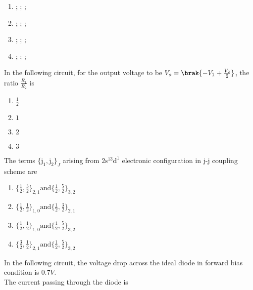 \begin{enumerate}
    \item {}; ; ; 
    \item {}; ; ; 
    \item {}; ; ; 
    \item {}; ; ; 
\end{enumerate}
\item In the following circuit, for the output voltage to be $V_o=\brak{-V_1+\frac{V_2}{2}}$, the ratio $\frac{R_1}{R_2}$ is
	
\begin{enumerate}
    \item $\frac{1}{2}$
    \item $1$
    \item $2$
    \item $3$
\end{enumerate}
\item The terms $\{\text{j}_1, \text{j}_2\}_J$ arising from $2\text{s}^13\text{d}^1$ electronic configuration in j-j coupling scheme are 
\begin{enumerate}
    \item $\{\frac{1}{2}, \frac{3}{2}\}_{2,1} \text{and} \{\frac{1}{2}, \frac{5}{2}\}_{3,2}$
    \item $\{\frac{1}{2}, \frac{1}{2}\}_{1,0} \text{and} \{\frac{1}{2}, \frac{3}{2}\}_{2,1}$
    \item $\{\frac{1}{2}, \frac{1}{2}\}_{1,0} \text{and} \{\frac{1}{2}, \frac{5}{2}\}_{3,2}$
    \item $\{\frac{3}{2}, \frac{1}{2}\}_{2,1} \text{and} \{\frac{1}{2}, \frac{5}{2}\}_{3,2}$
\end{enumerate}
\item In the following circuit, the voltage drop across the ideal diode in forward bias condition is $0.7V$.\\
	
	The current passing through the diode is 

